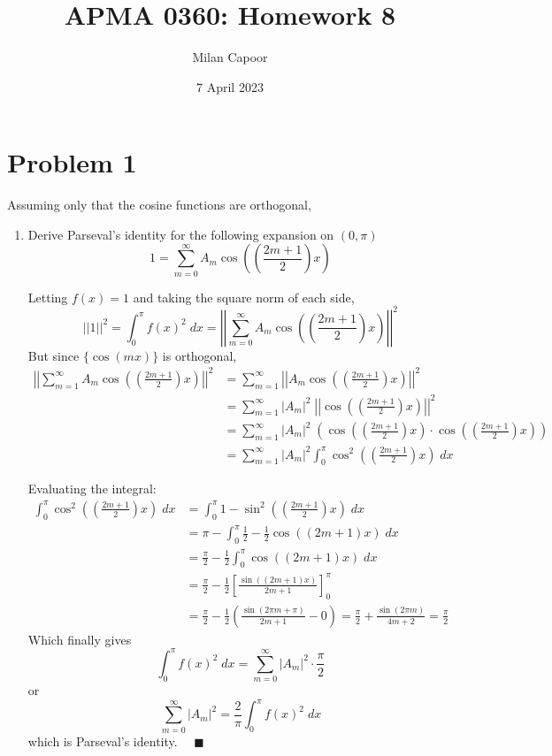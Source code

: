 \documentclass[12pt]{article}
\title{APMA 0360: Homework 8}
\author{Milan Capoor}
\date{7 April 2023}
\newcommand{\qed}{\quad \blacksquare}
\begin{document}
\maketitle
\section*{Problem 1}
Assuming only that the cosine functions are orthogonal,
\begin{enumerate}
    \item Derive Parseval's identity for the following expansion on $(0, \pi)$
    \[1 = \sum_{m=0}^\infty A_m \cos\left(\left(\frac{2m+1}{2}\right)x\right)\]
    
    \color{blue}
    Letting $f(x) = 1$ and taking the square norm of each side, 
    \[||1||^2 = \int_0^\pi f(x)^2 \; dx = \left|\left|\sum_{m=0}^\infty A_m \cos\left(\left(\frac{2m+1}{2}\right)x\right)\right|\right|^2\]
    But since $\{\cos(mx)\}$ is orthogonal, 
    \begin{align*}
        \left|\left|\sum_{m=1}^\infty A_m \cos\left(\left(\frac{2m+1}{2}\right)x\right)\right|\right|^2 &= \sum_{m=1}^\infty \left|\left|A_m \cos\left(\left(\frac{2m+1}{2}\right)x\right)\right|\right|^2\\
        &= \sum_{m=1}^\infty |A_m|^2\; \left|\left|\cos\left(\left(\frac{2m+1}{2}\right)x\right)\right|\right|^2\\
        &= \sum_{m=1}^\infty |A_m|^2\; \left(\cos\left(\left(\frac{2m+1}{2}\right)x\right) \cdot \cos\left(\left(\frac{2m+1}{2}\right)x\right)\right)\\
        &= \sum_{m=1}^\infty |A_m|^2 \int_0^\pi \cos^2 \left(\left(\frac{2m+1}{2}\right)x\right) \; dx
    \end{align*}

    Evaluating the integral:
    \begin{align*}
        \int_0^\pi \cos^2 \left(\left(\frac{2m+1}{2}\right)x\right) \; dx &= \int_0^\pi 1 - \sin^2\left(\left(\frac{2m+1}{2}\right)x\right)\; dx\\
        &= \pi - \int_0^\pi \frac{1}{2} - \frac{1}{2}\cos\left(\left(2m+1\right)x\right)\; dx\\
        &= \frac{\pi}{2} - \frac{1}{2} \int_0^\pi \cos((2m + 1)x)\; dx\\
        &= \frac{\pi}{2} - \frac{1}{2}\left[\frac{\sin((2m + 1)x)}{2m + 1}\right]_0^\pi\\
        &= \frac{\pi}{2} - \frac{1}{2}(\frac{\sin(2\pi m + \pi)}{2m + 1} - 0) = \frac{\pi}{2} + \frac{\sin(2\pi m)}{4m + 2} = \frac{\pi}{2}
    \end{align*}
    Which finally gives 
    \[\int_0^\pi f(x)^2\; dx = \sum_{m=0}^\infty |A_m|^2 \cdot \frac{\pi}{2} \]
    or 
    \[\sum_{m=0}^\infty |A_m|^2 = \frac{2}{\pi} \int_0^\pi f(x)^2 \; dx\]
    which is Parseval's identity. $\qed$


\end{enumerate}
\end{document}
